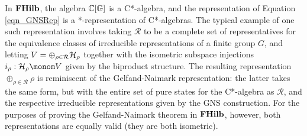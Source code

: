 In $\mathbf{FHilb}$, the algebra $\mathbb{C}[\mathbb{G}]$ is a C*-algebra, and the representation of Equation \ref{eqn_GNSRep} is a *-representation of C*-algebras. The typical example of one such representation involves taking $\mathcal{R}$ to be a complete set of representatives for the equivalence classes of irreducible representations of a finite group $G$, and letting $V = \oplus_{\rho \in \mathcal{R}} \mathcal{H}_\rho$ together with the isometric subspace injections $i_\rho : \SpaceH_\rho \monom V$ given by the biproduct structure. The resulting representation $\oplus_{\rho \in \mathcal{R}} \rho$ is reminiscent of the Gelfand-Naimark representation: the latter takes the same form, but with the entire set of pure states for the C*-algebra as $\mathcal{R}$, and the respective irreducible representations given by the GNS construction. For the purposes of proving the Gelfand-Naimark theorem in $\mathbf{FHilb}$, however, both representations are equally valid (they are both isometric).

